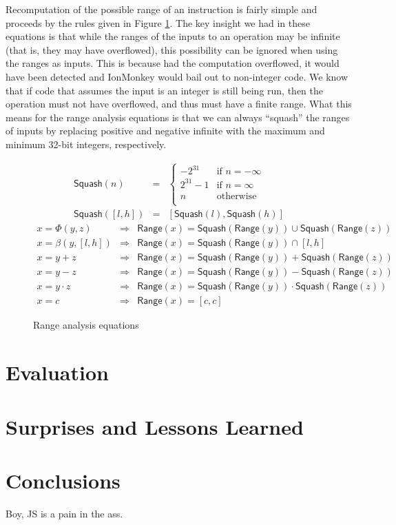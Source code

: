 \documentclass{article}
\newcommand{\Squash}{\mathsf{Squash}}
\newcommand{\Range}{\mathsf{Range}}
\let\x\cdot
\begin{document}
Recomputation of the possible range of an instruction is fairly simple
and proceeds by the rules given in Figure \ref{fig:range_anal}. The
key insight we had in these equations is that while the ranges of the
inputs to an operation may be infinite (that is, they may have
overflowed), this possibility can be ignored when using the ranges as
inputs. This is because had the computation overflowed, it would have
been detected and IonMonkey would bail out to non-integer code. We
know that if code that assumes the input is an integer is still being
run, then the operation must not have overflowed, and thus must have a
finite range. What this means for the range analysis equations is that
we can always ``squash'' the ranges of inputs by replacing positive
and negative infinite with the maximum and minimum 32-bit integers,
respectively.

\begin{figure}[ht]
\begin{eqnarray*}
\Squash(n) &=& \begin{cases}
 -2^{31} &\text{if } n = -\infty \\
2^{31}-1 &\text{if } n = \infty \\
n&\text{otherwise } \\
\end{cases}\\
\Squash([l, h]) &=& [\Squash(l), \Squash(h)]
\end{eqnarray*}
%
\begin{eqnarray*}
x = \Phi(y, z) &\Rightarrow&
    \Range(x) = \Squash(\Range(y)) \cup \Squash(\Range(z)) \\
x = \beta(y, [l, h]) &\Rightarrow& \Range(x) = \Squash(\Range(y)) \cap [l, h] \\
x = y + z &\Rightarrow& \Range(x) = \Squash(\Range(y)) + \Squash(\Range(z)) \\
x = y - z &\Rightarrow& \Range(x) = \Squash(\Range(y)) - \Squash(\Range(z)) \\
x = y \x z &\Rightarrow& \Range(x) = \Squash(\Range(y)) \x \Squash(\Range(z)) \\
x = c &\Rightarrow& \Range(x) = [c, c]
\end{eqnarray*}
\caption{Range analysis equations}
\label{fig:range_anal}
\end{figure}


\section{Evaluation}

\section{Surprises and Lessons Learned}

\section{Conclusions}
Boy, JS is a pain in the ass.

{}

\end{document}
